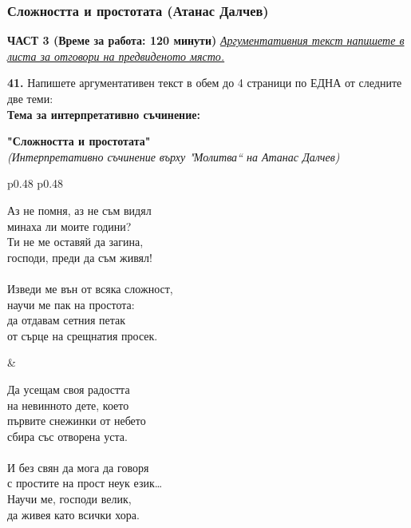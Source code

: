 \documentclass[12pt,a4paper]{article}
\begin{document}
\subsubsection{Сложността и простотата (Атанас Далчев)}
\vspace{0.5cm}
\begin{center}
\textbf{ЧАСТ 3 (Време за работа: 120 минути)}
\vspace{0.2cm}
{\textit{\underline{Аргументативния текст напишете в листа за отговори на предвиденото място.}}}
\vspace{0.1cm}
\end{center}
\textbf{41.} Напишете аргументативен текст в обем до 4 страници по ЕДНА от следните две теми:
\\
\vspace{0.2cm}
\textbf{Тема за интерпретативно съчинение:}
\vspace{0.1cm}
\begin{center}
\textbf{"Сложността и простотата"}
\\
\textit{(Интерпретативно съчинение върху "Молитва“ на Атанас Далчев)}
\end{center}
\begin{tabular}{p{0.48\textwidth} p{0.48\textwidth}}
\begin{minipage}[t]{\linewidth}
Аз не помня, аз не съм видял\\
минаха ли моите години?\\
Ти не ме оставяй да загина,\\
господи, преди да съм живял!\\
\\
Изведи ме вън от всяка сложност,\\
научи ме пак на простота:\\
да отдавам сетния петак\\
от сърце на срещнатия просек.\\
\end{minipage}
&
\begin{minipage}[t]{\linewidth}
Да усещам своя радостта\\
на невинното дете, което\\
първите снежинки от небето\\
сбира със отворена уста.\\
\\
И без свян да мога да говоря\\
с простите на прост неук език…\\
Научи ме, господи велик,\\
да живея като всички хора.\\
\end{minipage}
\end{tabular}
\end{document}
